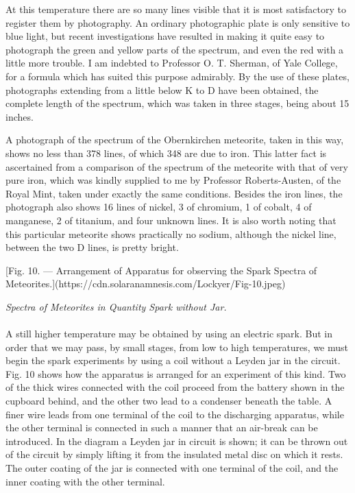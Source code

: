 \documentclass[a4paper, 12pt, oneside, polutonikogreek, english]{article}
\begin{document}
At this temperature there are so many lines visible that it is most satisfactory to register them by photography. An ordinary photographic plate is only sensitive to blue light, but recent investigations have resulted in making it quite easy to photograph the green and yellow parts of the spectrum, and even the red with a little more trouble. I am indebted to Professor O. T. Sherman, of Yale College, for a formula which has suited this purpose admirably. By the use of these plates, photographs extending from a little below K to D have been obtained, the complete length of the spectrum, which was taken in three stages, being about 15 inches.

A photograph of the spectrum of the Obernkirchen meteorite, taken in this way, shows no less than 378 lines, of which 348 are due to iron. This latter fact is ascertained from a comparison of the spectrum of the meteorite with that of very pure iron, which was kindly supplied to me by Professor Roberts-Austen, of the Royal Mint, taken under exactly the same conditions. Besides the iron lines, the photograph also shows 16 lines of nickel, 3 of chromium, 1 of cobalt, 4 of manganese, 2 of titanium, and four unknown lines. It is also worth noting that this particular meteorite shows practically no sodium, although the nickel line, between the two D lines, is pretty bright.

[Fig. 10. --- Arrangement of Apparatus for observing the Spark Spectra of Meteorites.](https://cdn.solaranamnesis.com/Lockyer/Fig-10.jpeg)
\begin{center}
\emph{Spectra of Meteorites in Quantity Spark without Jar.}
\end{center}
\paragraph{}
A still higher temperature may be obtained by using an electric spark. But in order that we may pass, by small stages, from low to high temperatures, we must begin the spark experiments by using a coil without a Leyden jar in the circuit. Fig. 10 shows how the apparatus is arranged for an experiment of this kind. Two of the thick wires connected with the coil proceed from the battery shown in the cupboard behind, and the other two lead to a condenser beneath the table. A finer wire leads from one terminal of the coil to the discharging apparatus, while the other terminal is connected in such a manner that an air-break can be introduced. In the diagram a Leyden jar in circuit is shown; it can be thrown out of the circuit by simply lifting it from the insulated metal disc on which it rests. The outer coating of the jar is connected with one terminal of the coil, and the inner coating with the other terminal.
\end{document}
